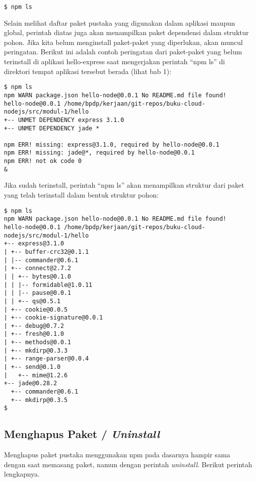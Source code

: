 \lstset{language=bash,caption=Argumen npm untuk melihat daftar paket terpasang}
\begin{lstlisting}
$ npm ls
\end{lstlisting}

Selain melihat daftar paket pustaka yang digunakan dalam aplikasi maupun global, perintah diatas juga akan menampilkan paket dependensi dalam struktur pohon. Jika kita belum menginstall paket-paket yang diperlukan, akan muncul peringatan. Berikut ini adalah contoh peringatan dari paket-paket yang belum terinstall di aplikasi hello-express saat mengerjakan perintah ``npm ls'' di direktori tempat aplikasi tersebut berada (lihat bab 1):

\lstset{language=bash,caption=npm ls pada aplikasi yang paket-paketnya belum terinstall}
\begin{lstlisting}
$ npm ls
npm WARN package.json hello-node@0.0.1 No README.md file found!
hello-node@0.0.1 /home/bpdp/kerjaan/git-repos/buku-cloud-nodejs/src/modul-1/hello
+-- UNMET DEPENDENCY express 3.1.0
+-- UNMET DEPENDENCY jade *

npm ERR! missing: express@3.1.0, required by hello-node@0.0.1
npm ERR! missing: jade@*, required by hello-node@0.0.1
npm ERR! not ok code 0
&
\end{lstlisting}

Jika sudah terinstall, perintah ``npm ls'' akan menampilkan struktur dari paket yang telah terinstall dalam bentuk struktur pohon:
\lstset{language=bash,caption=npm ls pada aplikasi yang paket-paketnya sudah terinstall}
\begin{lstlisting}
$ npm ls
npm WARN package.json hello-node@0.0.1 No README.md file found!
hello-node@0.0.1 /home/bpdp/kerjaan/git-repos/buku-cloud-nodejs/src/modul-1/hello
+-- express@3.1.0
| +-- buffer-crc32@0.1.1
| |-- commander@0.6.1
| +-- connect@2.7.2
| | +-- bytes@0.1.0
| | |-- formidable@1.0.11
| | |-- pause@0.0.1
| | +-- qs@0.5.1
| +-- cookie@0.0.5
| +-- cookie-signature@0.0.1
| +-- debug@0.7.2
| +-- fresh@0.1.0
| +-- methods@0.0.1
| +-- mkdirp@0.3.3
| +-- range-parser@0.0.4
| +-- send@0.1.0
|   +-- mime@1.2.6
+-- jade@0.28.2
  +-- commander@0.6.1
  +-- mkdirp@0.3.5
$
\end{lstlisting}

\subsection{Menghapus Paket / \textit{Uninstall}}

Menghapus paket pustaka menggunakan npm pada dasarnya hampir sama dengan saat memasang paket, namun dengan perintah \textit{uninstall}. Berikut perintah lengkapnya.

